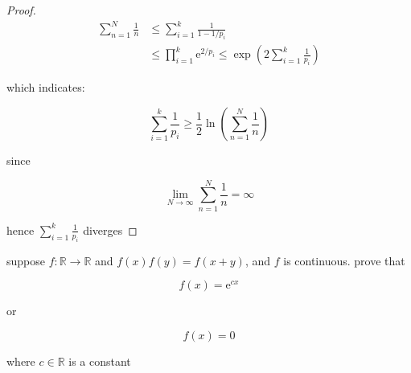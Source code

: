 \begin{proof}
    \begin{align*}
        \sum_{n=1}^{N}\frac{1}{n} &\le \sum_{i=1}^{k} \frac{1}{1-1/p_i} \\
        & \le \prod_{i=1}^{k} \mathrm{e}^{2/p_i}  \le \exp \left(  2\sum_{i=1}^{k} \frac{1}{p_i} \right)
    \end{align*}

    which indicates:

    \[
        \sum_{i=1}^{k} \frac{1}{p_i} \ge \frac{1}{2}\ln \left( \sum_{n=1}^{N} \frac{1}{n} \right)
    \]

    since 

    \[
        \lim_{N \to \infty} \sum_{n=1}^{N} \frac{1}{n}  = \infty
    \]

    hence $\sum_{i=1}^{k} \frac{1}{p_i}$ diverges

\end{proof}

\begin{exercise}
    suppose $f: \mathbb{R} \to \mathbb{R}$ and $f(x)f(y) = f(x+y)$, and $f$ is continuous. prove that

    \[
        f(x) = \mathrm{e}^{cx}
    \]

    or

    \[
        f(x) = 0
    \]

    where $c \in \mathbb{R}$ is a constant
\end{exercise}

